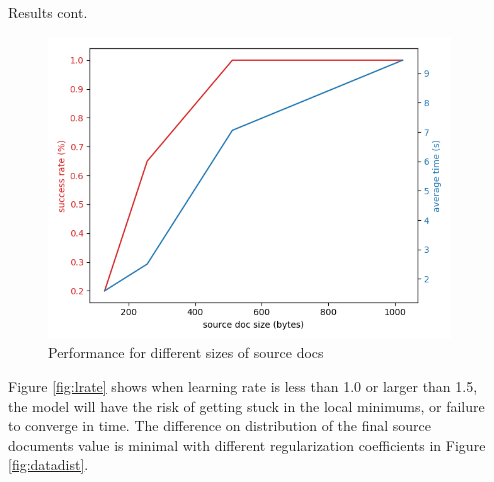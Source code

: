 \documentclass[final]{beamer}
\newlength{\onecolwid}
\newlength{\twocolwid}
\begin{document}
\begin{frame}[t]
\begin{columns}[t]
\begin{column}{\twocolwid}
\begin{columns}[t,totalwidth=\twocolwid]
\begin{column}{\onecolwid}

\end{column} %

\begin{column}{\onecolwid} %


\begin{block}{Results cont.}

\begin{figure}
    \includegraphics[width=0.8\linewidth]{source_doc_size}
    \caption{Performance for different sizes of source docs}
    \label{fig:docsize}
\end{figure}

Figure \ref{fig:lrate} shows when learning rate is less than 1.0 or larger than 1.5, the model will have the risk of getting stuck in the local minimums, or failure to converge in time. The difference on distribution of the final source documents value is minimal with different regularization coefficients in Figure \ref{fig:datadist}.

\end{block}


\end{column} %

\end{columns} %


\end{column}
\end{columns}
\end{frame}
\end{document}
